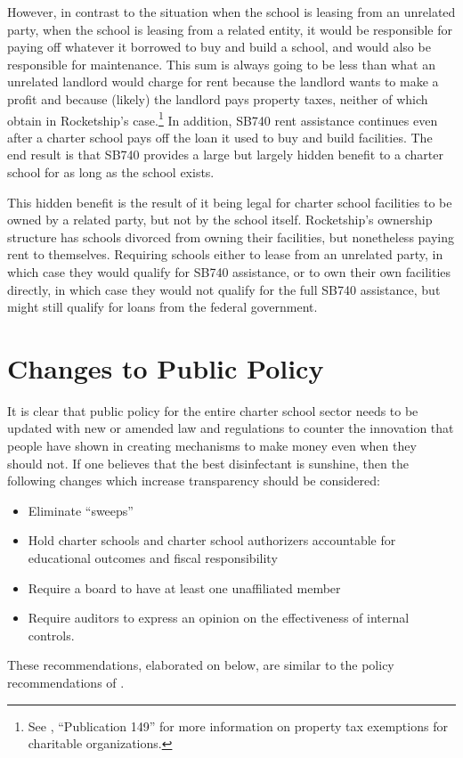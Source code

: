 However, in contrast to the situation when the school is leasing from an unrelated party, when the school is leasing from a related entity, it would be responsible for paying off whatever it borrowed to buy and build a school, and would also be responsible for maintenance. This sum is always going to be less than what an unrelated landlord would charge for rent because the landlord wants to make a profit and because (likely) the landlord pays property taxes, neither of which obtain in Rocketship's case.\footnote{See \textcite{BOE2018a}, ``Publication 149'' for more information on property tax exemptions for charitable organizations.} In addition, SB740 rent assistance continues even after a charter school pays off the loan it used to buy and build facilities. The end result is that SB740 provides a large but largely hidden benefit to a charter school for as long as the school exists.

This hidden benefit is the result of it being legal for charter school facilities to be owned by a related party, but not by the school itself. Rocketship's ownership structure has schools divorced from owning their facilities, but nonetheless paying rent to themselves. Requiring schools either to lease from an unrelated party, in which case they would qualify for SB740 assistance, or to own their own facilities directly, in which case they would not qualify for the full SB740 assistance, but might still qualify for loans from the federal government.

\section{Changes to Public Policy}%
\label{sec:chang-publ-policy}

It is clear that public policy for the entire charter school sector needs to be updated with new or amended law and regulations to counter the innovation that people have shown in creating mechanisms to make money even when they should not. If one believes that the best disinfectant is sunshine, then the following changes which increase transparency should be considered:
\begin{itemize}
  \item Eliminate ``sweeps''
  \item Hold charter schools and charter school authorizers accountable for educational outcomes and fiscal responsibility
  \item Require a board to have at least one unaffiliated member
  \item Require auditors to express an opinion on the effectiveness of internal controls.
\end{itemize}
These recommendations, elaborated on below, are similar to the policy recommendations of \textcite[44–46]{Baker.Miron2015}.%

